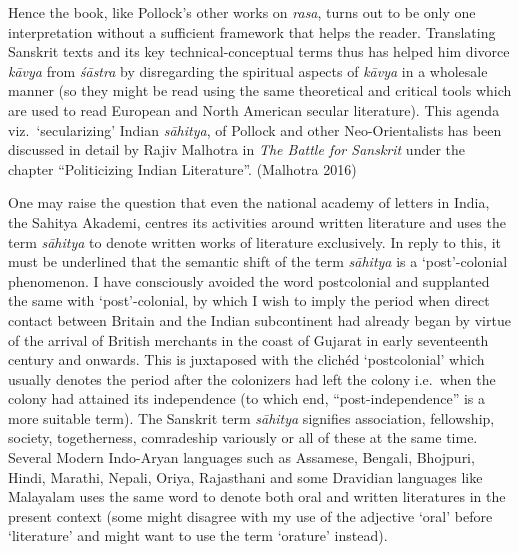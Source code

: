 Hence the book, like Pollock’s other works on \textsl{rasa}, turns out to be only one interpretation without a sufficient framework that helps the reader. Translating Sanskrit texts and its key technical-conceptual terms thus has helped him divorce \textsl{kāvya} from \textsl{śāstra} by disregarding the spiritual aspects of \textsl{kāvya} in a wholesale manner (so they might be read using the same theoretical and critical tools which are used to read European and North American secular literature). This agenda viz.~‘secularizing’ Indian \textsl{sāhitya}, of Pollock and other Neo-Orientalists has been discussed in detail by Rajiv Malhotra in \textsl{The Battle for Sanskrit} under the chapter “Politicizing Indian Literature”. (Malhotra 2016) 

One may raise the question that even the national academy of letters in India, the Sahitya Akademi, centres its activities around written literature and uses the term \textsl{sāhitya} to denote written works of literature exclusively. In reply to this, it must be underlined that the semantic shift of the term \textsl{sāhitya} is a ‘post’-colonial phenomenon. I have consciously avoided the word postcolonial and supplanted the same with ‘post’-colonial, by which I wish to imply the period when direct contact between Britain and the Indian subcontinent had already began by virtue of the arrival of British merchants in the coast of Gujarat in early seventeenth century and onwards. This is juxtaposed with the clichéd ‘postcolonial’ which usually denotes the period after the colonizers had left the colony i.e.~when the colony had attained its independence (to which end, ``post-independence'' is a more suitable term). The Sanskrit term \textsl{sāhitya} signifies association, fellowship, society, togetherness, comradeship variously or all of these at the same time. Several Modern Indo-Aryan languages such as Assamese, Bengali, Bhojpuri, Hindi, Marathi, Nepali, Oriya, Rajasthani and some Dravidian languages like Malayalam uses the same word to denote both oral and written literatures in the present context (some might disagree with my use of the adjective ‘oral’ before ‘literature’ and might want to use the term ‘orature’ instead).\\[-21pt]

